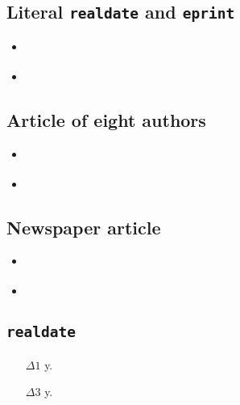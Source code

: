 \documentclass[a4paper,12pt]{scrartcl}
\newcommand*{\Feld}[1]{\texttt{#1}}
\begin{document}
\subsection{Literal \Feld{realdate} and \Feld{eprint}}
\begin{itemize}
    \item\cite{lindauer:oj}%
    \item{}%
\end{itemize}

\subsection{Article of eight authors}
\begin{itemize}
    \item\cite{summerhayes:et:al:1993}%
    \item{}%
\end{itemize}

\subsection{Newspaper article}
\begin{itemize}
    \item\cite{stafford:2004}%
    \item{}%
\end{itemize}

\subsection{\Feld{realdate}}
\begin{itemize}
    \item[$\Delta 1$ y.]%
    \item[$\Delta 3$ y.]%
\end{itemize}

\printbibliography

\end{document}
